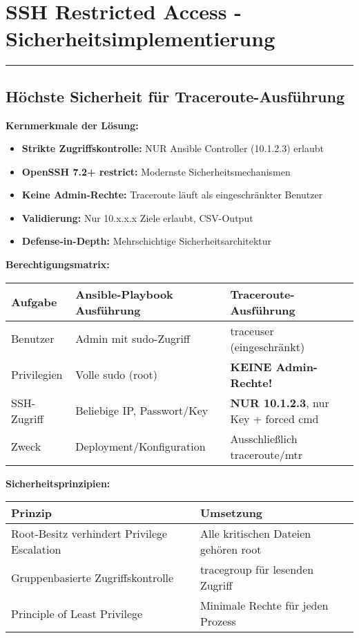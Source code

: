 \documentclass[11pt,landscape]{article}
\begin{document}
\section*{\textbf{\huge SSH Restricted Access - Sicherheitsimplementierung}}
\vspace{-0.3cm}
\noindent\rule{\textwidth}{0.4pt}
\vspace{0.3cm}
\subsection*{\Large H\"ochste Sicherheit f\"ur Traceroute-Ausf\"uhrung}

\textbf{\large Kernmerkmale der L\"osung:}
\begin{itemize}
    \item \textbf{Strikte Zugriffskontrolle:} NUR Ansible Controller (10.1.2.3) erlaubt
    \item \textbf{OpenSSH 7.2+ restrict:} Modernste Sicherheitsmechanismen  
    \item \textbf{Keine Admin-Rechte:} Traceroute l\"auft als eingeschr\"ankter Benutzer
    \item \textbf{Validierung:} Nur 10.x.x.x Ziele erlaubt, CSV-Output
    \item \textbf{Defense-in-Depth:} Mehrschichtige Sicherheitsarchitektur
\end{itemize}

\textbf{\large Berechtigungsmatrix:}

\begin{center}
{\large
\begin{tabular}{|l|l|l|}
\hline
\textbf{Aufgabe} & \textbf{Ansible-Playbook Ausf\"uhrung} & \textbf{Traceroute-Ausf\"uhrung} \\
\hline
Benutzer & Admin mit sudo-Zugriff & traceuser (eingeschr\"ankt) \\
Privilegien & Volle sudo (root) & \textbf{KEINE Admin-Rechte!} \\
SSH-Zugriff & Beliebige IP, Passwort/Key & \textbf{NUR 10.1.2.3}, nur Key + forced cmd \\
Zweck & Deployment/Konfiguration & Ausschlie\ss{}lich traceroute/mtr \\
\hline
\end{tabular}
}
\end{center}

\textbf{\large Sicherheitsprinzipien:}

\begin{center}
{\large
\begin{tabular}{|l|l|}
\hline
\textbf{Prinzip} & \textbf{Umsetzung} \\
\hline
Root-Besitz verhindert Privilege Escalation & Alle kritischen Dateien geh\"oren root \\
Gruppenbasierte Zugriffskontrolle & tracegroup f\"ur lesenden Zugriff \\
Principle of Least Privilege & Minimale Rechte f\"ur jeden Prozess \\
\hline
\end{tabular}
}
\end{center}
\end{document}
